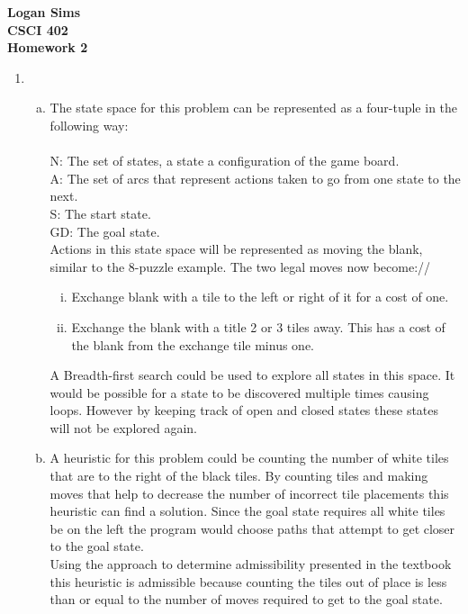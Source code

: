 \documentclass[11pt]{article}
\begin{document}
\begin{center}
\textbf{Logan Sims \\ CSCI 402 \\ Homework 2  }
\end{center}

\begin{enumerate}[1.]
\item
  \begin{enumerate}[a.]
  \item
  The state space for this problem can be represented as a four-tuple in the following way:\\\\
  N: The set of states, a state a configuration of the game board.\\
  A: The set of arcs that represent actions taken to go from one state to the next.\\
  S: The start state.\\
  GD: The goal state.\\
  
  Actions in this state space will be represented as moving the blank, similar to the 8-puzzle example. The two legal moves now become://
  \begin{enumerate}[i.]
  \item Exchange blank with a tile to the left or right of it for a cost of one.
  \item Exchange the blank with a title 2 or 3 tiles away. This has a cost of the blank from the exchange tile minus one. 
  \end{enumerate}
  
  A Breadth-first search could be used to explore all states in this space. It would be possible for a state to be discovered multiple times causing loops. However by keeping track of open and closed states these states will not be explored again. 
  
  \item
  A heuristic for this problem could be counting the number of white tiles that are to the right of the black tiles. By counting tiles and making moves that help to decrease the number of incorrect tile placements this heuristic can find a solution. Since the goal state requires all white tiles be on the left the program would choose paths that attempt to get closer to the goal state.\\
  
  Using the approach to determine admissibility presented in the textbook this heuristic is admissible because counting the tiles out of place is less than or equal to the number of moves required to get to the goal state.\\
  

\end{enumerate}
\end{enumerate}
\end{document}
